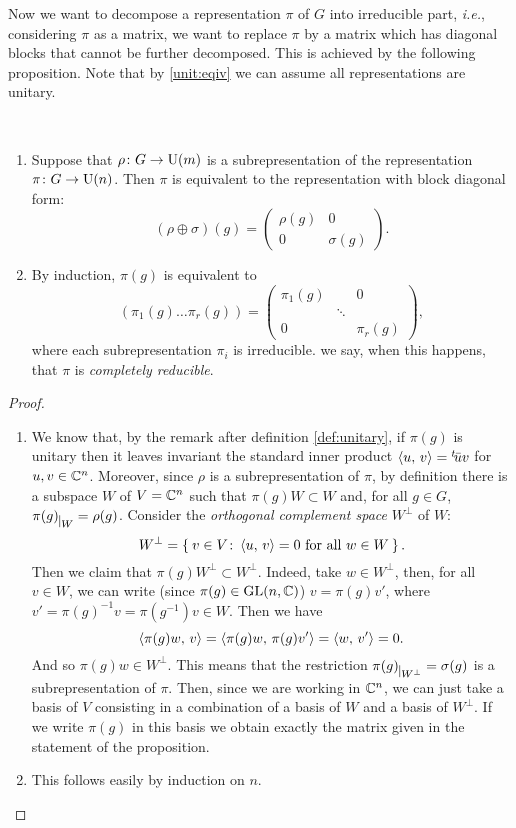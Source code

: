 Now we want to decompose a representation $\pi$ of $G$ into irreducible part, \textit{i.e.}, considering $\pi$ as a matrix, we want to replace $\pi$ by a matrix which has diagonal blocks that cannot be further decomposed. This is achieved by the following proposition.
Note that by \ref{unit:eqiv} we can assume all representations are unitary.
\begin{prop}~ 
\label{thm:complred}
\begin{enumerate}
\item Suppose that $\rho\colon G\rightarrow \operatorname{U}(m)$ is a subrepresentation of the representation $\pi\colon G\rightarrow \operatorname{U}(n)$. Then $\pi$ is equivalent to the representation with block diagonal form:
\[(\rho \oplus \sigma)(g)=
\begin{pmatrix}
\rho(g) & 0 \\
0 		& \sigma(g)
\end{pmatrix}.
\]
\item By induction, $\pi(g)$ is equivalent to
\[
(\pi_1(g)\dots \pi_r(g))= 
\begin{pmatrix}
\pi_1(g)  &{} &0\\
{} &\ddots &{} \\
0 &{}  &\pi_r(g)
\end{pmatrix},
\]
where each subrepresentation $\pi_i$  is irreducible. we say, when this happens, that $\pi$ is \emph{completely reducible}. 
\end{enumerate}
\end{prop}
\begin{proof}~ 
\begin{enumerate}
\item We know that, by the remark after definition \ref{def:unitary}, if $\pi(g)$ is unitary then it leaves invariant the standard inner product $\braket{u,\, v}={}^t\!\bar{u}v$ for $u,v \in {\mathbb C}^n$. Moreover, since $\rho$ is a subrepresentation of $\pi$, by definition there is a subspace $W$ of $V={\mathbb C}^n$ such that $\pi(g)W\subset W$ and, for all $g\in G$, $\pi(g)_{\mkern 1mu \vrule height 2ex\mkern2mu W}= \rho(g)$.  Consider the \emph{orthogonal complement space} $W^\perp$ of $W$:
\[
W^{\perp}= \Set{v \in V \colon \braket{u, \, v}=0 \text{ for all } w \in W}.
\]
Then we claim that $\pi(g)W^{\perp}\subset W^{\perp}$. Indeed, take $w\in W^{\perp}$, then, for all $v\in W$, we can write (since $\pi(g) \in \operatorname{GL}(n,{\mathbb C})$) $v=\pi(g)v'$, where $v'=\pi(g)^{-1}v=\pi(g^{-1})v \in W$. Then we have 
\[
\braket{\pi(g)w,\, v}=\braket{\pi(g)w,\, \pi(g)v'}=\braket{w,\, v'}=0.
\]
And so $\pi(g)w\in W^{\perp}$. This means that the restriction $\pi(g)_{\mkern 1mu \vrule height 2ex\mkern2mu W^{\perp}}= \sigma(g)$ is a subrepresentation of $\pi$.  Then, since we are working in ${\mathbb C}^n$, we can just take a basis of $V$ consisting in a combination of a basis of $W$ and a basis of $W^{\perp}$. If we write $\pi(g)$ in this basis we obtain exactly the matrix given in the statement of the proposition.
\item This follows easily by induction on $n$.
\end{enumerate}
\end{proof}

